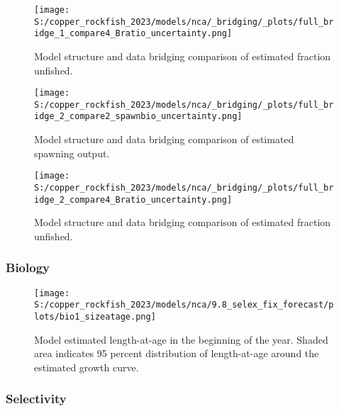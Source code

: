 \documentclass[
  letterpaper,
]{article}
\begin{document}
\pagebreak

\begin{figure}
\centering
\texttt{[image: S:/copper\_rockfish\_2023/models/nca/\_bridging/\_plots/full\_bridge\_1\_compare4\_Bratio\_uncertainty.png]}
\caption{Model structure and data bridging comparison of estimated fraction unfished.\label{fig:data-bridge-depl-1}}
\end{figure}

\pagebreak

\begin{figure}
\centering
\texttt{[image: S:/copper\_rockfish\_2023/models/nca/\_bridging/\_plots/full\_bridge\_2\_compare2\_spawnbio\_uncertainty.png]}
\caption{Model structure and data bridging comparison of estimated spawning output.\label{fig:data-bridge-ssb-2}}
\end{figure}

\pagebreak

\begin{figure}
\centering
\texttt{[image: S:/copper\_rockfish\_2023/models/nca/\_bridging/\_plots/full\_bridge\_2\_compare4\_Bratio\_uncertainty.png]}
\caption{Model structure and data bridging comparison of estimated fraction unfished.\label{fig:data-bridge-depl-2}}
\end{figure}

\pagebreak

\pagebreak

\hypertarget{biology-1}{%
\subsubsection{Biology}\label{biology-1}}

\begin{figure}
\centering
\texttt{[image: S:/copper\_rockfish\_2023/models/nca/9.8\_selex\_fix\_forecast/plots/bio1\_sizeatage.png]}
\caption{Model estimated length-at-age in the beginning of the year. Shaded area indicates 95 percent distribution of length-at-age around the estimated growth curve.\label{fig:mod-est-len-age}}
\end{figure}

\pagebreak

\hypertarget{selectivity}{%
\subsubsection{Selectivity}\label{selectivity}}
\end{document}
